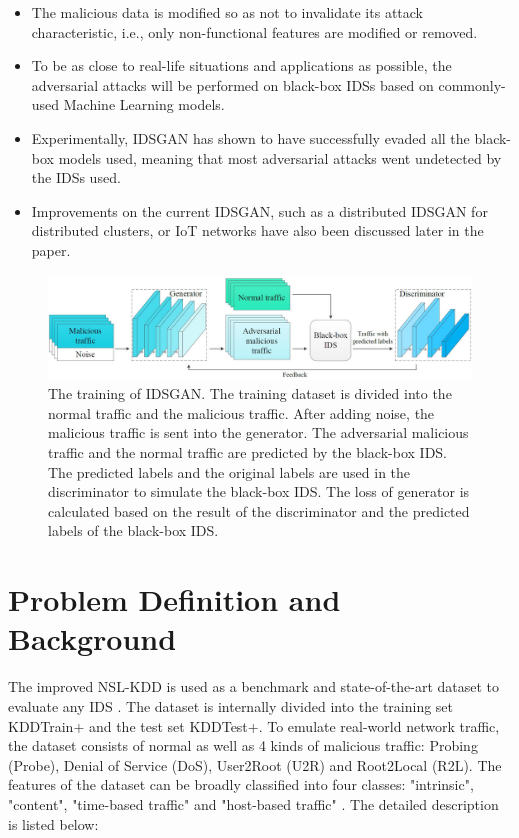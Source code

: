 \documentclass[10pt, conference, compsocconf]{IEEEtran}
\begin{document}
\begin{itemize}

\item The malicious data is modified so as not to invalidate its attack characteristic, i.e., only non-functional features are modified or removed.

\item To be as close to real-life situations and applications as possible, the adversarial attacks will be performed on black-box IDSs based on commonly-used Machine Learning models.

\item Experimentally, IDSGAN has shown to have successfully evaded all the black-box models used, meaning that most adversarial attacks went undetected by the IDSs used.

\item Improvements on the current IDSGAN, such as a distributed IDSGAN for distributed clusters, or IoT networks have also been discussed later in the paper.

\end{itemize}

\begin{figure}

\includegraphics[width=\textwidth]{./images/img1.jpeg}
\caption{The training of IDSGAN. The training dataset is divided into the normal traffic and the malicious traffic. After adding
noise, the malicious traffic is sent into the generator. The adversarial malicious traffic and the normal traffic are predicted by the black-box IDS. The predicted labels and the original labels are used in the discriminator to simulate the black-box IDS. The
loss of generator is calculated based on the result of the discriminator and the predicted labels of the black-box IDS.}

\end{figure}

\section {Problem Definition and Background }

The improved NSL-KDD is used as a benchmark and state-of-the-art dataset to evaluate any IDS \cite{hu2015improv}. The dataset is internally divided into the training set KDDTrain+ and the test set KDDTest+. To emulate real-world network traffic, the dataset consists of normal as well as 4 kinds of malicious traffic: Probing (Probe), Denial of Service (DoS), User2Root (U2R) and Root2Local (R2L). The features of the dataset can be broadly classified into four classes: "intrinsic", "content", "time-based traffic" and "host-based traffic" \cite{davis2011data} \cite{lee2000frame}. The detailed description is listed below:
\end{document}
